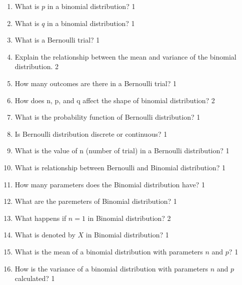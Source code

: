 \documentclass[a4paper,oneside]{book}
\begin{document}
 \begin{enumerate}
 
 \item What is $p$ in a binomial distribution? \hfill 1
 
 \item What is $q$ in a binomial distribution? \hfill 1
 
 \item What is a Bernoulli trial?  \hfill 1
 
 \item Explain the relationship between the mean and variance of the binomial distribution. \hfill 2
 
 \item How many outcomes are there in a Bernoulli trial?  \hfill 1
 
 \item How does n, p, and q affect the shape of binomial distribution? \hfill 2
 
 \item What is the probability function of Bernoulli distribution? \hfill 1
 
 \item Is Bernoulli distribution discrete or continuous? \hfill 1
 
 \item What is the value of n (number of trial) in a Bernoulli distribution? \hfill 1
 
 \item What is relationship between Bernoulli and Binomial distribution? \hfill 1
 
 \item How many parameters does the Binomial distribution have? \hfill 1
  
  \item What are the paremeters of Binomial distribution? \hfill 1
  
  \item What happens if $n=1$ in Binomial distribution? \hfill 2
  
  \item What is denoted by $X$ in Binomial distribution? \hfill 1
  
 \item What is the mean of a binomial distribution with parameters \( n \) and \( p \)? \hfill 1

\item How is the variance of a binomial distribution with parameters \( n \) and \( p \) calculated? \hfill 1


\end{enumerate}
\end{document}
